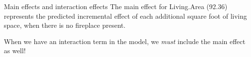 \documentclass{beamer}\usepackage[]{graphicx}\usepackage[]{color}
\begin{document}
\begin{darkframes}
\begin{frame}[fragile]{Main effects and interaction effects}
      \pause
      The main effect for Living.Area (92.36) represents the predicted incremental effect of each additional square foot of living space, when there is no fireplace present.

      \bigskip\pause
      When we have an interaction term in the model, we \emph{must} include the main effect as well!
    \end{frame}
  \end{darkframes}
\end{document}
